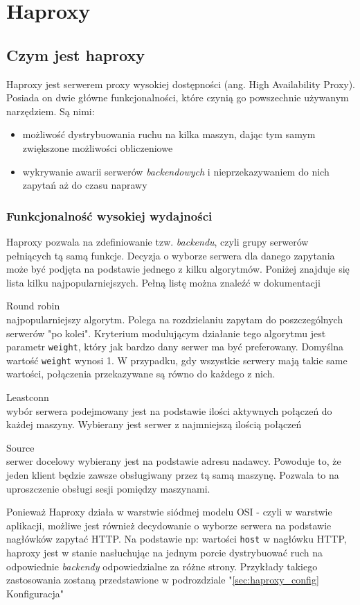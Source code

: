 {\section{Haproxy}
\subsection{Czym jest haproxy}
Haproxy jest serwerem proxy wysokiej dostępności (ang. High Availability Proxy).\\
Posiada on dwie główne funkcjonalności, które czynią go powszechnie używanym narzędziem.
Są nimi:\\
\begin{itemize}
	\item możliwość dystrybuowania ruchu na kilka maszyn, dając tym samym zwiększone możliwości obliczeniowe
	\item wykrywanie awarii serwerów \textit{backendowych} i nieprzekazywaniem do nich zapytań aż do czasu naprawy
\end{itemize}
\subsubsection{Funkcjonalność wysokiej wydajności}
Haproxy pozwala na zdefiniowanie tzw. \textit{backendu}, czyli grupy serwerów pełniących tą samą funkcje.
Decyzja o wyborze serwera dla danego zapytania może być podjęta na podstawie jednego z kilku algorytmów.
Poniżej znajduje się lista kilku najpopularniejszych. Pełną listę można znaleźć w dokumentacji\\
\begin{description}
	\item{Round robin}\\
		najpopularniejszy algorytm. Polega na rozdzielaniu zapytam do poszczególnych serwerów "po kolei".
		Kryterium modulującym działanie tego algorytmu jest parametr \texttt{weight}, który jak bardzo dany serwer ma być preferowany.
		Domyślna wartość \texttt{weight} wynosi 1. W przypadku, gdy wszystkie serwery mają takie same wartości, połączenia przekazywane są równo do każdego z nich.
	\item{Leastconn}\\
		wybór serwera podejmowany jest na podstawie ilości aktywnych połączeń do każdej maszyny.
		Wybierany jest serwer z najmniejszą ilością połączeń
	\item{Source}\\
		serwer docelowy wybierany jest na podstawie adresu nadawcy.
		Powoduje to, że jeden klient będzie zawsze obsługiwany przez tą samą maszynę. Pozwala to na uproszczenie obsługi sesji pomiędzy maszynami.
\end{description}
Ponieważ Haproxy działa w warstwie siódmej modelu OSI - czyli w warstwie aplikacji, możliwe jest również decydowanie o wyborze serwera na podstawie nagłówków zapytać HTTP.
Na podstawie np: wartości \texttt{host} w nagłówku HTTP, haproxy jest w stanie nasłuchując na jednym porcie dystrybuować ruch na odpowiednie \textit{backendy} odpowiedzialne za różne strony.
Przykłady takiego zastosowania zostaną przedstawione w podrozdziale "\ref{sec:haproxy_config} Konfiguracja"
}
